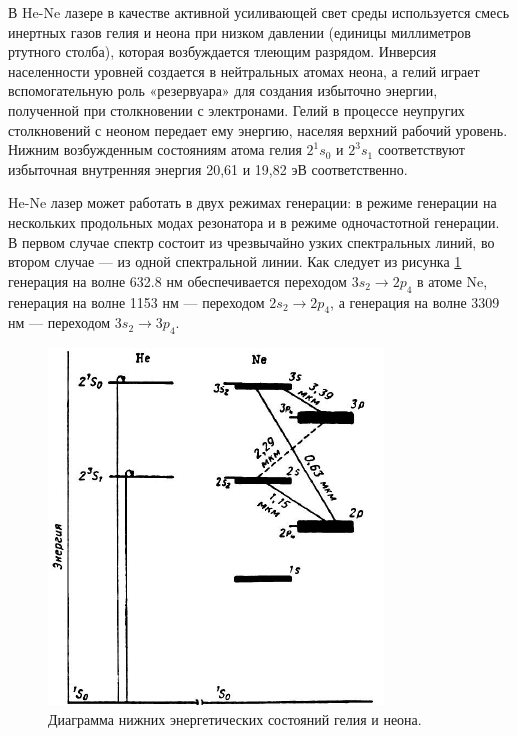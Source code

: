 \documentclass[12pt, russian, a4paper]{article}
\begin{document}
	
	\setcounter{page}{2}



	В He-Ne лазере в качестве активной усиливающей свет среды используется смесь инертных газов гелия и неона при низком давлении (единицы миллиметров ртутного столба), которая возбуждается тлеющим разрядом. Инверсия населенности уровней создается в нейтральных атомах неона, а гелий играет вспомогательную роль «резервуара» для создания избыточно энергии, полученной при столкновении с электронами. Гелий в процессе неупругих столкновений с неоном передает ему энергию, населяя верхний рабочий уровень. Нижним возбужденным состояниям атома гелия $2^1s_0$ и $2^3s_1$ соответствуют избыточная внутренняя энергия 20,61 и 19,82 эВ соответственно.

	He-Ne лазер может работать в двух режимах генерации: в режиме  генерации на нескольких продольных модах резонатора и в режиме одночастотной генерации. В первом случае спектр состоит из чрезвычайно узких спектральных линий, во втором случае --- из одной спектральной линии. Как следует из рисунка \ref{fig:he-ne-enrgy} генерация на волне 632.8 нм обеспечивается переходом $3s_2\rightarrow2p_4$ в атоме Ne, генерация на волне 1153 нм --- переходом $2s_2\rightarrow2p_4$, а генерация на волне 3309 нм --- переходом $3s_2\rightarrow3p_4$.

	\begin{figure}[htbp]
		\centering
		\includegraphics[scale=0.8]{he-ne-enrgy.png}
		\caption{Диаграмма нижних энергетических состояний гелия и неона.}
		\label{fig:he-ne-enrgy}
	\end{figure}
\end{document}
